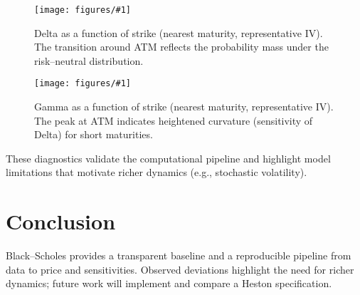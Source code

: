 \documentclass[12pt]{article}
\newcommand{\fig}[3]{%
\begin{figure}[h]
\centering
\texttt{[image: figures/\#1]}
\caption{#2}
\label{fig:#3}
\end{figure}}
\begin{document}
\fig{delta_vs_strike.png}{Delta as a function of strike (nearest maturity, representative IV). The transition around ATM reflects the probability mass under the risk--neutral distribution.}{delta}
\fig{gamma_vs_strike.png}{Gamma as a function of strike (nearest maturity, representative IV). The peak at ATM indicates heightened curvature (sensitivity of Delta) for short maturities.}{gamma}

These diagnostics validate the computational pipeline and highlight model limitations that motivate richer dynamics (e.g., stochastic volatility).


\section{Conclusion}
Black--Scholes provides a transparent baseline and a reproducible pipeline from data to price and sensitivities.
Observed deviations highlight the need for richer dynamics; future work will implement and compare a Heston specification.



\end{document}
